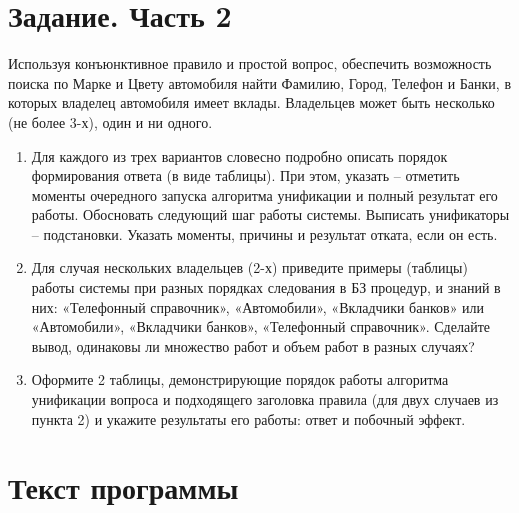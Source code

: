 \vspace{-0.5cm}
\section{Задание. Часть 2}
\vspace{-0.5cm}

Используя конъюнктивное правило и простой вопрос, обеспечить возможность поиска
по Марке и Цвету автомобиля найти Фамилию, Город, Телефон и Банки, в которых
владелец автомобиля имеет вклады. Владельцев может быть несколько (не более
3-х), один и ни одного.

\begin{enumerate}[label=\arabic*)]
    \item Для каждого из трех вариантов словесно подробно описать порядок
        формирования ответа (в виде таблицы). При этом, указать – отметить
        моменты очередного запуска алгоритма унификации и полный результат его
        работы.  Обосновать следующий шаг работы системы. Выписать унификаторы –
        подстановки. Указать моменты, причины и результат отката, если он есть.
    \item Для случая нескольких владельцев (2-х) приведите примеры (таблицы)
        работы системы при разных порядках следования в БЗ процедур, и знаний в
        них: «Телефонный справочник», «Автомобили», «Вкладчики банков» или
        «Автомобили», «Вкладчики банков», «Телефонный справочник». Сделайте
        вывод, одинаковы ли множество работ и объем работ в разных случаях?
    \item Оформите 2 таблицы, демонстрирующие порядок работы алгоритма
        унификации вопроса и подходящего заголовка правила (для двух случаев из
        пункта 2) и укажите результаты его работы: ответ и побочный эффект.
\end{enumerate}

\vspace{-0.5cm}
\section{Текст программы}
\vspace{-0.5cm}


